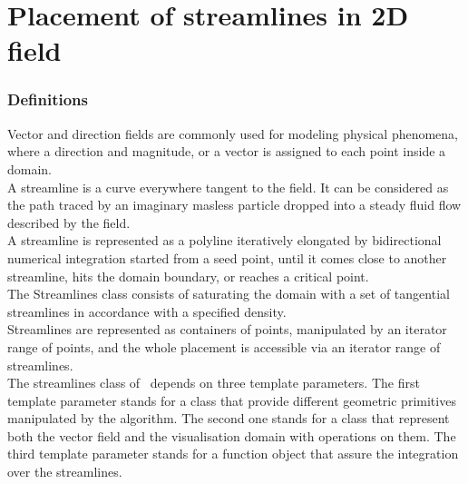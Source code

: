 
\chapter{Placement of streamlines in 2D field}
\label{ref_chapter_2D_Streamlines}

\subsection*{Definitions}
Vector and direction fields are commonly used for modeling physical
phenomena, where a direction and magnitude, or a vector is assigned to
each point inside a domain.\\ A streamline is a curve everywhere
tangent to the field. It can be considered as the path traced by an
imaginary masless particle dropped into a steady fluid flow described
by the field.\\ A streamline is represented as a polyline iteratively
elongated by bidirectional numerical integration started from a seed
point, until it comes close to another streamline, hits the domain
boundary, or reaches a critical point.\\ The Streamlines class consists
of saturating the domain with a set of tangential streamlines in
accordance with a specified density.\\ Streamlines are represented as
containers of points, manipulated by an iterator range of points, and the
whole placement is accessible via an iterator range of streamlines.\\ The
streamlines class of \cgal\ depends on three
template parameters.  The first template parameter stands for a class
that provide different geometric primitives manipulated by the
algorithm. The second one stands for a class that represent both the
vector field and the visualisation domain with operations on them.
The third template parameter stands for a function object that assure
the integration over the streamlines.

